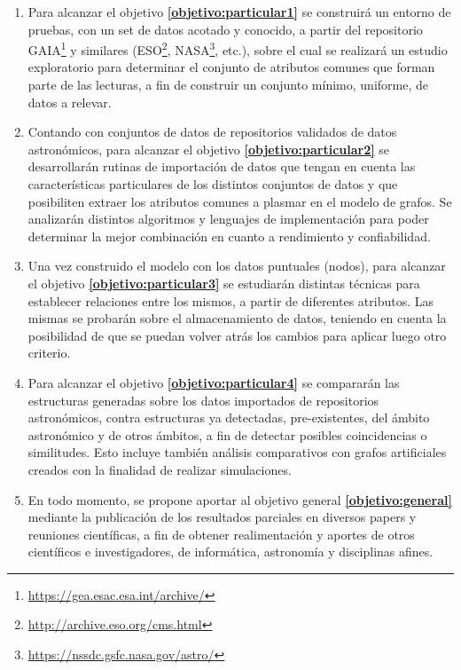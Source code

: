 \documentclass[
	11pt,oneside,a4paper,
	fleqn,
	article
]{memoir}
\begin{document}
\begin{enumerate}[label*=\fbox{A\arabic*}]
	\item Para alcanzar el objetivo \textbf{\ref{objetivo:particular1}} se construirá un entorno de pruebas, con un set de datos acotado y conocido, a partir del repositorio GAIA\footnote{\url{https://gea.esac.esa.int/archive/}} y similares (ESO\footnote{\url{http://archive.eso.org/cms.html}}, NASA\footnote{\url{https://nssdc.gsfc.nasa.gov/astro/}}, etc.), sobre el cual se realizará un estudio exploratorio para determinar el conjunto de atributos comunes que forman parte de las lecturas, a fin de construir un conjunto mínimo, uniforme, de datos a relevar.
	\item Contando con conjuntos de datos de repositorios validados de datos astronómicos, para alcanzar el objetivo \textbf{\ref{objetivo:particular2}} se desarrollarán rutinas de importación de datos que tengan en cuenta las características particulares de los distintos conjuntos de datos y que posibiliten extraer los atributos comunes a plasmar en el modelo de grafos. Se analizarán distintos algoritmos y lenguajes de implementación para poder determinar la mejor combinación en cuanto a rendimiento y confiabilidad.
	\item Una vez construido el modelo con los datos puntuales (nodos), para alcanzar el objetivo \textbf{\ref{objetivo:particular3}} se estudiarán distintas técnicas para establecer relaciones entre los mismos, a partir de diferentes atributos. Las mismas se probarán sobre el almacenamiento de datos, teniendo en cuenta la posibilidad de que se puedan volver atrás los cambios para aplicar luego otro criterio.
	\item Para alcanzar el objetivo \textbf{\ref{objetivo:particular4}} se compararán las estructuras generadas sobre los datos importados de repositorios astronómicos, contra estructuras ya detectadas, pre-existentes, del ámbito astronómico y de otros ámbitos, a fin de detectar posibles coincidencias o similitudes. Esto incluye también análisis comparativos con grafos artificiales creados con la finalidad de realizar simulaciones.
	\item En todo momento, se propone aportar al objetivo general \textbf{\ref{objetivo:general}} mediante la publicación de los resultados parciales en diversos papers y reuniones científicas, a fin de obtener realimentación y aportes de otros científicos e investigadores, de informática, astronomía y disciplinas afines.
\end{enumerate}
\end{document}
